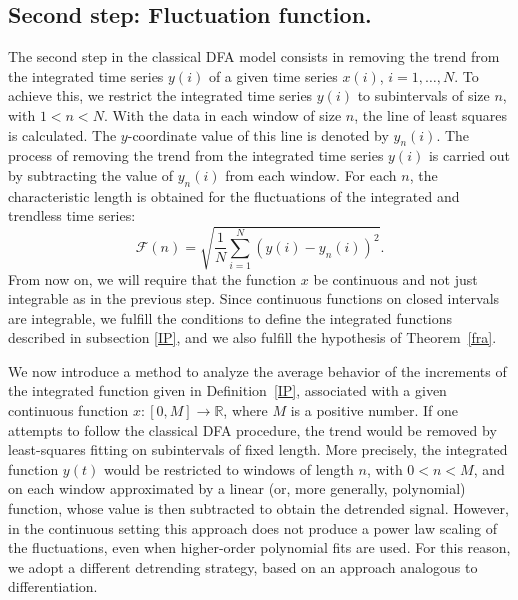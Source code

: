 \documentclass{amsart}
\begin{document}
\subsection{Second step: Fluctuation function.}
The second step in the classical DFA model consists in removing the trend from the integrated time series $y(i)$ of a given time series $x(i)$, $i=1,\ldots , N$. To achieve this, we restrict the integrated time series $y(i)$ to subintervals of size $n$, with $1<n<N$. With the data in each window of size $n$, the line of least squares is calculated. 
The $y$-coordinate value of this line is denoted by $y_n(i)$. The process of removing the trend from the integrated time series $y(i)$ is
carried out by subtracting the value of $y_n(i)$ from each window. For each $n$, the characteristic length is obtained for the fluctuations of the integrated and trendless time series:
\begin{equation*}
    \mathcal{F}(n)=\sqrt{\frac{1}{N}\sum_{i=1}^N(y(i)-y_n(i))^2}.
\end{equation*}
From now on, we will require that the function $x$ be continuous and not just integrable as in the previous step. Since continuous functions on closed intervals are integrable,  we fulfill the conditions to define the integrated functions described in subsection \ref{IP}, and we also fulfill the hypothesis of  Theorem~\ref{fra}.

We now introduce a method to analyze the average behavior of the increments of the integrated function given in Definition~\ref{IP}, associated with a given continuous function $x\colon [0,M]\to\mathbb{R}$, where $M$ is a positive number. If one attempts to follow the classical DFA procedure, the trend would be removed by least-squares fitting on subintervals of fixed length. More precisely, the integrated function $y(t)$ would be restricted to windows of length $n$, with $0<n<M$, and on each window approximated by a linear (or, more generally, polynomial) function, whose value is then subtracted to obtain the detrended signal.
However, in the continuous setting this approach does not produce a power law scaling of the fluctuations, even when higher-order polynomial fits are used. For this reason, we adopt a different detrending strategy, based on an approach analogous to differentiation.
\end{document}
